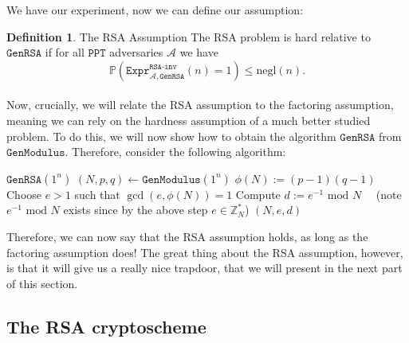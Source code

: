 \documentclass{article}
\theoremstyle{definition}
\newtheorem{definition}{Definition}[section]
\newcommand{\A}{\mathcal{A}}
\newcommand{\Prob}{\mathbb{P}}
\newcommand{\Int}{\mathbb{Z}}
\newcommand{\PPT}{\texttt{PPT}}
\newcommand{\negl}{\text{negl}}
\renewcommand{\mod}{\,\,\text{mod}\,\,}
\newcommand{\Expr}[2]{\texttt{Expr}^{\texttt{#1}}_{#2}}
\newcommand{\GenModulus}{\texttt{GenModulus}}
\newcommand{\GenRSA}{\texttt{GenRSA}}
\begin{document}
  We have our experiment, now we can define our assumption:
 \begin{definition}{The RSA Assumption}
  The RSA problem is hard relative to $\GenRSA$ if for all $\PPT$ adversaries $\A$
  we have
  \[
    \Prob(\Expr{RSA-inv}{\A, \GenRSA}(n) = 1) \leq \negl(n).
  \]
\end{definition}
\paragraph{} Now, crucially, we will relate the RSA assumption to the factoring
assumption, meaning we can rely on the hardness assumption of a much better
studied problem. To do this, we will now show how to obtain the algorithm
$\GenRSA$ from $\GenModulus$. Therefore, consider the following algorithm:
  \begin{algorithmic}
    \State $\GenRSA(1^n)$
    \State $(N, p, q) \leftarrow \GenModulus(1^n)$
    \State $\phi(N) := (p - 1)(q - 1)$
    \State Choose $e > 1$ such that $\gcd(e, \phi(N)) = 1$
    \State Compute $d := e^{-1} \mod N \quad$ (note $e^{-1} \mod N$ exists since
    by the above step $e \in \Int^*_N$) 
    \State \Return $(N, e, d)$
    \State
  \end{algorithmic}
Therefore, we can now say that the RSA assumption holds, as long as the
factoring assumption does! The great thing about the RSA assumption, however, is
that it will give us a really nice trapdoor, that we will present in the next
part of this section.
\subsection{The RSA cryptoscheme}
\end{document}
